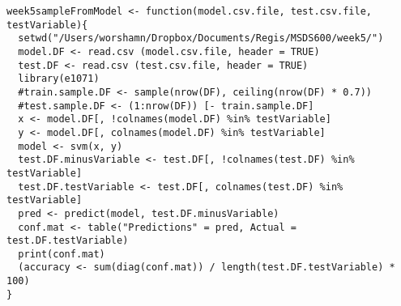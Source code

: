 \documentclass[10pt]{article}
\begin{document}
\begin{verbatim}
week5sampleFromModel <- function(model.csv.file, test.csv.file, testVariable){
  setwd("/Users/worshamn/Dropbox/Documents/Regis/MSDS600/week5/")
  model.DF <- read.csv (model.csv.file, header = TRUE)
  test.DF <- read.csv (test.csv.file, header = TRUE)
  library(e1071)
  #train.sample.DF <- sample(nrow(DF), ceiling(nrow(DF) * 0.7))
  #test.sample.DF <- (1:nrow(DF)) [- train.sample.DF]
  x <- model.DF[, !colnames(model.DF) %in% testVariable]
  y <- model.DF[, colnames(model.DF) %in% testVariable]
  model <- svm(x, y)
  test.DF.minusVariable <- test.DF[, !colnames(test.DF) %in% testVariable]
  test.DF.testVariable <- test.DF[, colnames(test.DF) %in% testVariable]
  pred <- predict(model, test.DF.minusVariable)
  conf.mat <- table("Predictions" = pred, Actual = test.DF.testVariable)
  print(conf.mat)
  (accuracy <- sum(diag(conf.mat)) / length(test.DF.testVariable) * 100)
}
\end{verbatim}
\end{document}
